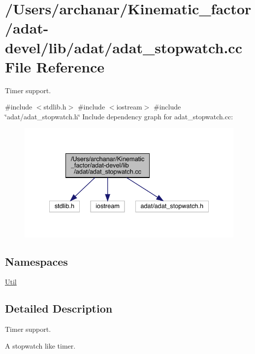 \hypertarget{adat-devel_2lib_2adat_2adat__stopwatch_8cc}{}\section{/\+Users/archanar/\+Kinematic\+\_\+factor/adat-\/devel/lib/adat/adat\+\_\+stopwatch.cc File Reference}
\label{adat-devel_2lib_2adat_2adat__stopwatch_8cc}


Timer support.  


{\ttfamily \#include $<$stdlib.\+h$>$}\newline
{\ttfamily \#include $<$iostream$>$}\newline
{\ttfamily \#include \char`\"{}adat/adat\+\_\+stopwatch.\+h\char`\"{}}\newline
Include dependency graph for adat\+\_\+stopwatch.\+cc\+:
\nopagebreak
\begin{figure}[H]
\begin{center}
\leavevmode
\includegraphics[width=334pt]{db/d48/adat-devel_2lib_2adat_2adat__stopwatch_8cc__incl}
\end{center}
\end{figure}
\subsection*{Namespaces}
\begin{DoxyCompactItemize}
\item 
 \mbox{\hyperlink{namespaceUtil}{Util}}
\end{DoxyCompactItemize}


\subsection{Detailed Description}
Timer support. 

A stopwatch like timer. 